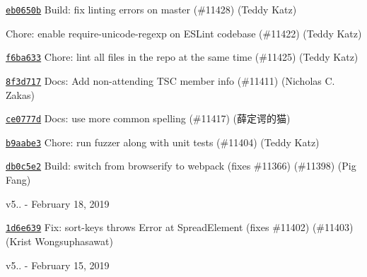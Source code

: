 \begin{DoxyItemize}
\item \href{https://github.com/eslint/eslint/commit/eb0650ba20cf9f9ad78dbaccfeb7e0e7ab56e31d}{\texttt{ {\ttfamily eb0650b}}} Build\+: fix linting errors on master (\#11428) (Teddy Katz)
\item \href{https://github.com/eslint/eslint/commit/5018378131fd5190bbccca902c0cf4276ee1581a}{\texttt{ {}}} Chore\+: enable require-\/unicode-\/regexp on E\+S\+Lint codebase (\#11422) (Teddy Katz)
\item \href{https://github.com/eslint/eslint/commit/f6ba633f56eca6be20fc4b0d9496a78b9498d578}{\texttt{ {\ttfamily f6ba633}}} Chore\+: lint all files in the repo at the same time (\#11425) (Teddy Katz)
\item \href{https://github.com/eslint/eslint/commit/8f3d71754932669332ad7623bcc4c1aef3897125}{\texttt{ {\ttfamily 8f3d717}}} Docs\+: Add non-\/attending T\+SC member info (\#11411) (Nicholas C. Zakas)
\item \href{https://github.com/eslint/eslint/commit/ce0777da5bc167fe0c529158fd8216d3eaf11565}{\texttt{ {\ttfamily ce0777d}}} Docs\+: use more common spelling (\#11417) (薛定谔的猫)
\item \href{https://github.com/eslint/eslint/commit/b9aabe34311f6189b87c9d8a1aa40f3513fed773}{\texttt{ {\ttfamily b9aabe3}}} Chore\+: run fuzzer along with unit tests (\#11404) (Teddy Katz)
\item \href{https://github.com/eslint/eslint/commit/db0c5e2a7f894b7cda71007b0ba43d7814b3fb2e}{\texttt{ {\ttfamily db0c5e2}}} Build\+: switch from browserify to webpack (fixes \#11366) (\#11398) (Pig Fang)
\end{DoxyItemize}

v5.. -\/ February 18, 2019


\begin{DoxyItemize}
\item \href{https://github.com/eslint/eslint/commit/1d6e63930073e79e52890f552cc6e9a0646b7fb4}{\texttt{ {\ttfamily 1d6e639}}} Fix\+: sort-\/keys throws Error at Spread\+Element (fixes \#11402) (\#11403) (Krist Wongsuphasawat)
\end{DoxyItemize}

v5.. -\/ February 15, 2019


